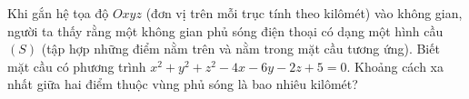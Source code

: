 \begin{bt}%
	Khi gắn hệ tọa độ $Oxyz$ (đơn vị trên mỗi trục tính theo kilômét) vào không gian, người ta thấy rằng một không gian phủ sóng điện thoại có dạng một hình cầu $(S)$ (tập hợp những  điểm nằm trên và nằm trong mặt cầu tương ứng). Biết mặt cầu có phương trình $x^2+y^2+z^2-4x-6y-2z+5=0$. Khoảng cách xa nhất giữa hai điểm thuộc vùng phủ sóng là bao nhiêu kilômét?
\end{bt}

